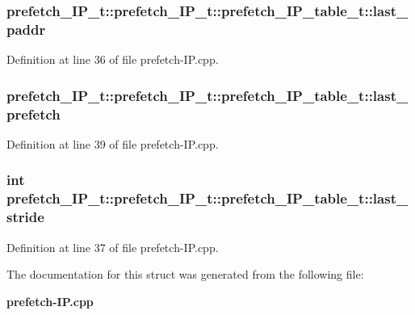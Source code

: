 \subsubsection[{last\_\-paddr}]{ prefetch\_\-IP\_\-t::prefetch\_\-IP\_\-t::prefetch\_\-IP\_\-table\_\-t::last\_\-paddr}\label{structprefetch__IP__t_1_1prefetch__IP__table__t_6c48c10a9aa217ddfe9494a8b2a2dbfa}




Definition at line 36 of file prefetch-IP.cpp.
\subsubsection[{last\_\-prefetch}]{ prefetch\_\-IP\_\-t::prefetch\_\-IP\_\-t::prefetch\_\-IP\_\-table\_\-t::last\_\-prefetch}\label{structprefetch__IP__t_1_1prefetch__IP__table__t_2b29ed811a2211809c03cae896676ae4}




Definition at line 39 of file prefetch-IP.cpp.
\subsubsection[{last\_\-stride}]{\setlength{\rightskip}{0pt plus 5cm}int prefetch\_\-IP\_\-t::prefetch\_\-IP\_\-t::prefetch\_\-IP\_\-table\_\-t::last\_\-stride}\label{structprefetch__IP__t_1_1prefetch__IP__table__t_00aefe10938b92fb508a4a9e049dc03b}




Definition at line 37 of file prefetch-IP.cpp.

The documentation for this struct was generated from the following file:\begin{CompactItemize}
\item 
{\bf prefetch-IP.cpp}\end{CompactItemize}
